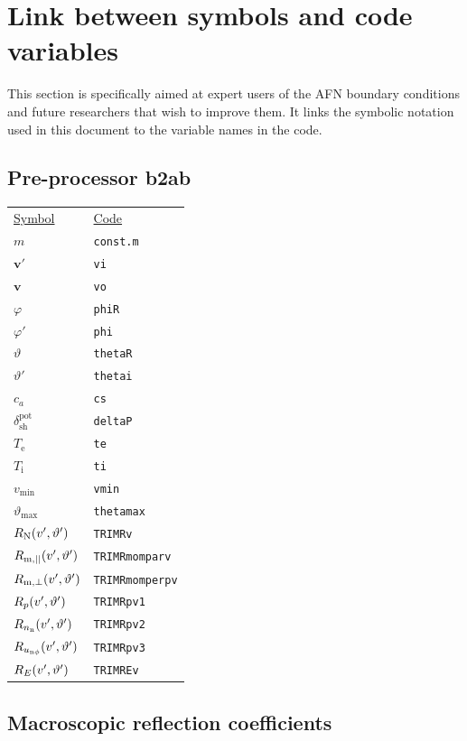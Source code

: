\section{Link between symbols and code variables}

This section is specifically aimed at expert users of the AFN boundary conditions and future researchers that wish to improve them. It links the symbolic notation used in this document to the variable names in the code.

\subsection{Pre-processor b2ab}

\begin{tabular}{L{3cm} L{4cm}}
\underline{Symbol} & \underline{Code} \\
$m$ & \texttt{const.m}\\
$\mathbf{v}'$ & \texttt{vi}\\
$\mathbf{v}$ & \texttt{vo}\\
$\varphi$ & \texttt{phiR}\\
$\varphi'$ & \texttt{phi} \\
$\vartheta$ & \texttt{thetaR}\\
$\vartheta'$ & \texttt{thetai}\\
$c_a$ & \texttt{cs}\\
$\delta^{\mathrm{pot}}_{\mathrm{sh}}$ & \texttt{deltaP}\\
$T_{\mathrm{e}}$ & \texttt{te}\\
$T_{\mathrm{i}}$ & \texttt{ti}\\
$v_{\mathrm{min}}$ & \texttt{vmin}\\
$\vartheta_{\mathrm{max}}$ & \texttt{thetamax}\\
$R_{\mathrm{N}}(v',\vartheta')$ & \texttt{TRIMRv} \\
$R_{\mathrm{m,||}}(v',\vartheta')$ & \texttt{TRIMRmomparv}\\
$R_{\mathrm{m,\perp}}(v',\vartheta')$ & \texttt{TRIMRmomperpv}\\
$R_p(v',\vartheta')$ & \texttt{TRIMRpv1}\\
$R_{n_{\mathrm{n}}}(v',\vartheta')$ & \texttt{TRIMRpv2}\\
$R_{u_{\mathrm{n}\phi}}(v',\vartheta')$ & \texttt{TRIMRpv3}\\
$R_E(v',\vartheta')$ & \texttt{TRIMREv}\\
\end{tabular}

\subsection{Macroscopic reflection coefficients}

